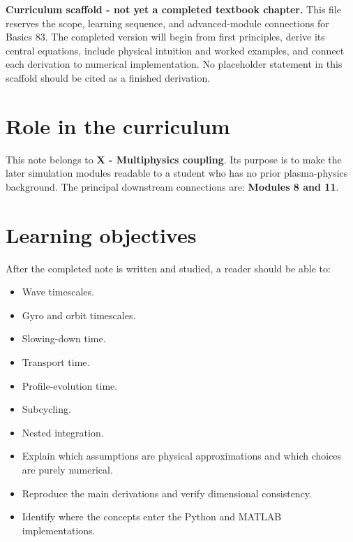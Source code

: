 \documentclass[11pt]{article}
\begin{document}

\begin{overviewbox}
\textbf{Curriculum scaffold - not yet a completed textbook chapter.} This file reserves the scope, learning sequence, and advanced-module connections for Basics 83. The completed version will begin from first principles, derive its central equations, include physical intuition and worked examples, and connect each derivation to numerical implementation. No placeholder statement in this scaffold should be cited as a finished derivation.
\end{overviewbox}

\ProjectTOC

\section{Role in the curriculum}
This note belongs to \textbf{X - Multiphysics coupling}. Its purpose is to make the later simulation modules readable to a student who has no prior plasma-physics background. The principal downstream connections are: \textbf{Modules 8 and 11}.

\section{Learning objectives}
After the completed note is written and studied, a reader should be able to:
\begin{itemize}[leftmargin=1.6em]
\item Wave timescales.
\item Gyro and orbit timescales.
\item Slowing-down time.
\item Transport time.
\item Profile-evolution time.
\item Subcycling.
\item Nested integration.
\item Explain which assumptions are physical approximations and which choices are purely numerical.
\item Reproduce the main derivations and verify dimensional consistency.
\item Identify where the concepts enter the Python and MATLAB implementations.
\end{itemize}
\end{document}
